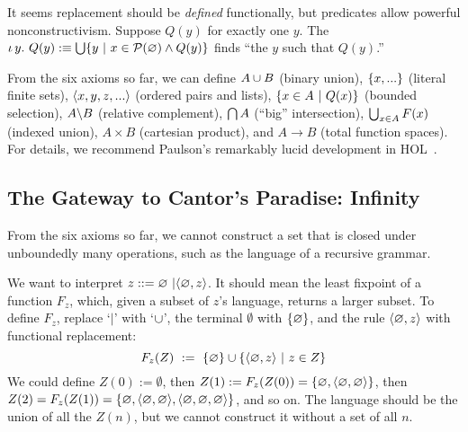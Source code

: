 It seems replacement should be \emph{defined} functionally, but predicates allow powerful nonconstructivism.
Suppose $Q(y)$ for exactly one $y$.
The  $\iota\,{y}\ldotp\, Q(y) :\equiv \textstyle\bigcup \lbrace {y} \ \lvert\ {x \in \mathcal{P}(\varnothing) \wedge Q(y)} \rbrace$ finds ``the $y$ such that $Q(y)$.''

From the six axioms so far, we can define $A \cup B$ (binary union), $\{{x,...}\}$ (literal finite sets), $\langle{x,y,z,...}\rangle$ (ordered pairs and lists), $\lbrace {x \in A} \ \lvert\ {Q(x)} \rbrace$ (bounded selection), $A \backslash B$ (relative complement), $\textstyle\bigcap A$ (``big'' intersection), $\textstyle\bigcup_{x \in A} F(x)$ (indexed union), $A \times B$ (cartesian product), and $A \to B$ (total function spaces).
For details, we recommend Paulson's remarkably lucid development in HOL~\cite{cit:paulson-1993-settheory-i}.

\subsection{The Gateway to Cantor's Paradise: Infinity}

From the six axioms so far, we cannot construct a set that is closed under unboundedly many operations, such as the language of a recursive grammar.
\begin{example}
We want to interpret $z ::= \varnothing \ | \langle{\varnothing,z}\rangle$. It should mean the least fixpoint of a function $F_z$, which, given a subset of $z$'s language, returns a larger subset. To define $F_z$, replace `$|$' with `$\cup$', the terminal $\emptyset$ with $\{{\varnothing}\}$, and the rule $\langle{\varnothing,z}\rangle$ with functional replacement:
\begin{equation}
	F_z(Z)\ \metadef\ \set{\emptyset} \u \setb{\pair{\emptyset,z}}{z \in Z}
\label{eqn:f-of-z}
\end{equation}
We could define $Z(0) := \emptyset$, then $Z(1) := F_z(Z(0)) = \{{\varnothing,\langle{\varnothing,\varnothing}\rangle}\} $, then $Z(2) = F_z(Z(1)) = \{{\varnothing, \langle{\varnothing,\varnothing}\rangle, \langle{\varnothing,\varnothing,\varnothing}\rangle}\}$, and so on. The language should be the union of all the $Z(n)$, but we cannot construct it without a set of all $n$.
\exampleqed
\end{example}

